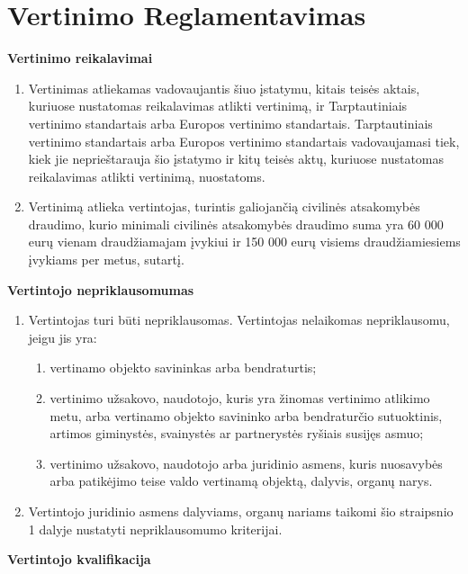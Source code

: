 
\section{Vertinimo Reglamentavimas}

\textbf{Vertinimo reikalavimai}

\begin{enumerate}
    \item Vertinimas atliekamas vadovaujantis šiuo įstatymu, kitais teisės aktais, kuriuose nustatomas reikalavimas atlikti vertinimą, ir Tarptautiniais vertinimo standartais arba Europos vertinimo standartais. Tarptautiniais vertinimo standartais arba Europos vertinimo standartais vadovaujamasi tiek, kiek jie neprieštarauja šio įstatymo ir kitų teisės aktų, kuriuose nustatomas reikalavimas atlikti vertinimą, nuostatoms.
    \item Vertinimą atlieka vertintojas, turintis galiojančią civilinės atsakomybės draudimo, kurio minimali civilinės atsakomybės draudimo suma yra 60 000 eurų vienam draudžiamajam įvykiui ir 150 000 eurų visiems draudžiamiesiems įvykiams per metus, sutartį.
\end{enumerate}

\textbf{Vertintojo nepriklausomumas}

\begin{enumerate}
    \item Vertintojas turi būti nepriklausomas. Vertintojas nelaikomas nepriklausomu, jeigu jis yra:
    \begin{enumerate}
        \item vertinamo objekto savininkas arba bendraturtis;
        \item vertinimo užsakovo, naudotojo, kuris yra žinomas vertinimo atlikimo metu, arba vertinamo objekto savininko arba bendraturčio sutuoktinis, artimos giminystės, svainystės ar partnerystės ryšiais susijęs asmuo;
        \item vertinimo užsakovo, naudotojo arba juridinio asmens, kuris nuosavybės arba patikėjimo teise valdo vertinamą objektą, dalyvis, organų narys.
    \end{enumerate}
    \item Vertintojo juridinio asmens dalyviams, organų nariams taikomi šio straipsnio 1 dalyje nustatyti nepriklausomumo kriterijai.
\end{enumerate}

\textbf{Vertintojo kvalifikacija}

